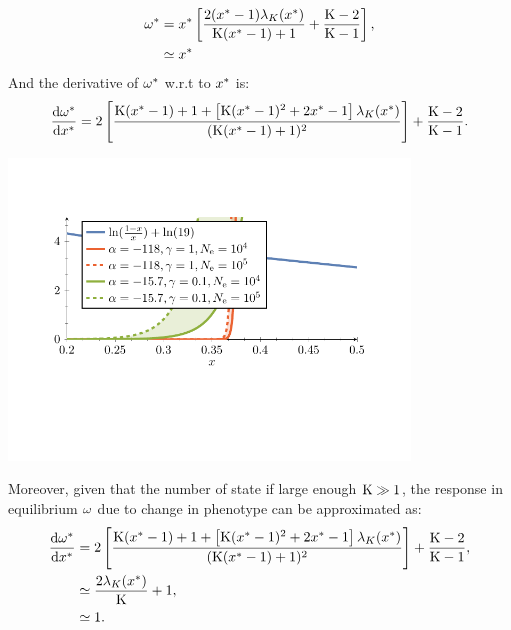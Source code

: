 \documentclass{article}
\begin{document}
\begin{align}
\omega^{*}  & = x^{*} \left[ \frac{2 (x^{*}-1)  \lambda_{K}(x^{*}) }{\text{K} (x^{*}-1)+1} + \frac{\text{K} - 2}{\text{K} - 1}\right], \\
& \simeq x^{*}
\end{align}
And the derivative of $\omega^{*}$ w.r.t to $x^{*}$ is: 
\begin{gather}
\frac{\mathrm{d} \omega^{*}}{\mathrm{d} x^{*}} = 2 \left[ \frac{\text{K} (x^{*}- 1) + 1+\left[\text{K} (x^{*}-1)^2+2 x^{*}-1\right] \lambda_{K}(x^{*}) }{(\text{K} (x^{*}-1)+1)^2}\right] + \frac{\text{K} - 2}{\text{K} - 1} \label{eq:dw_dx}.
\end{gather}
\begin{center}
 \includegraphics[width=0.8\textwidth, page=3] {figures.pdf}
\end{center}
Moreover, given that the number of state if large enough $\text{K} \gg 1$, the response in equilibrium $\omega$ due to change in phenotype can be approximated as:
\begin{align}
\frac{ \mathrm{d} \omega^{*}}{\mathrm{d} x^{*}}  & = 2 \left[ \frac{\text{K} (x^{*}- 1) + 1+\left[\text{K} (x^{*}-1)^2+2 x^{*}-1\right] \lambda_{K}(x^{*}) }{(\text{K} (x^{*}-1)+1)^2}\right] + \frac{\text{K} - 2}{\text{K} - 1}, \\
& \simeq \frac{2 \lambda_{K}(x^{*})}{\text{K}} + 1, \\
& \simeq 1. \label{eq:approx_domega_dx}
\end{align}
\end{document}
